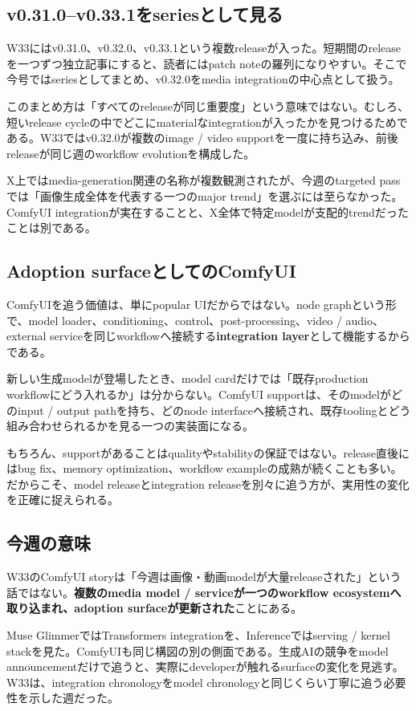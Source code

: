\subsection*{v0.31.0--v0.33.1をseriesとして見る}

W33にはv0.31.0、v0.32.0、v0.33.1という複数releaseが入った\cite{comfyui-0310,comfyui-0320,comfyui-0331}。短期間のreleaseを一つずつ独立記事にすると、読者にはpatch noteの羅列になりやすい。そこで今号ではseriesとしてまとめ、v0.32.0をmedia integrationの中心点として扱う。

このまとめ方は「すべてのreleaseが同じ重要度」という意味ではない。むしろ、短いrelease cycleの中でどこにmaterialなintegrationが入ったかを見つけるためである。W33ではv0.32.0が複数のimage / video supportを一度に持ち込み、前後releaseが同じ週のworkflow evolutionを構成した。

\begin{communitynote}
X上ではmedia-generation関連の名称が複数観測されたが、今週のtargeted passでは「画像生成全体を代表する一つのmajor trend」を選ぶには至らなかった\cite{w33-grok-r3-review}。ComfyUI integrationが実在することと、X全体で特定modelが支配的trendだったことは別である。
\end{communitynote}

\subsection*{Adoption surfaceとしてのComfyUI}

ComfyUIを追う価値は、単にpopular UIだからではない。node graphという形で、model loader、conditioning、control、post-processing、video / audio、external serviceを同じworkflowへ接続する\textbf{integration layer}として機能するからである。

新しい生成modelが登場したとき、model cardだけでは「既存production workflowにどう入れるか」は分からない。ComfyUI supportは、そのmodelがどのinput / output pathを持ち、どのnode interfaceへ接続され、既存toolingとどう組み合わせられるかを見る一つの実装面になる。

もちろん、supportがあることはqualityやstabilityの保証ではない。release直後にはbug fix、memory optimization、workflow exampleの成熟が続くことも多い。だからこそ、model releaseとintegration releaseを別々に追う方が、実用性の変化を正確に捉えられる。

\subsection*{今週の意味}

W33のComfyUI storyは「今週は画像・動画modelが大量releaseされた」という話ではない。\textbf{複数のmedia model / serviceが一つのworkflow ecosystemへ取り込まれ、adoption surfaceが更新された}ことにある。

Muse GlimmerではTransformers integrationを、Inferenceではserving / kernel stackを見た。ComfyUIも同じ構図の別の側面である。生成AIの競争をmodel announcementだけで追うと、実際にdeveloperが触れるsurfaceの変化を見逃す。W33は、integration chronologyをmodel chronologyと同じくらい丁寧に追う必要性を示した週だった。
